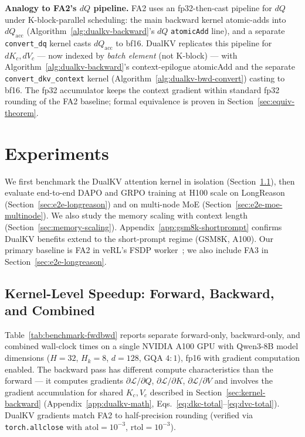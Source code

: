 \documentclass{article}
\begin{document}
\textbf{Analogy to FA2's $dQ$ pipeline.} FA2 uses an fp32-then-cast pipeline for $dQ$ under K-block-parallel scheduling: the main backward kernel atomic-adds into $dQ_{\text{acc}}$ (Algorithm~\ref{alg:dualkv-backward}'s $dQ$ \texttt{atomicAdd} line), and a separate \texttt{convert\_dq} kernel casts $dQ_{\text{acc}}$ to bf16. DualKV replicates this pipeline for $dK_c, dV_c$ --- now indexed by \emph{batch element} (not K-block) --- with Algorithm~\ref{alg:dualkv-backward}'s context-epilogue atomicAdd and the separate \texttt{convert\_dkv\_context} kernel (Algorithm~\ref{alg:dualkv-bwd-convert}) casting to bf16. The fp32 accumulator keeps the context gradient within standard fp32 rounding of the FA2 baseline; formal equivalence is proven in Section~\ref{sec:equiv-theorem}.

\section{Experiments}
\label{sec:experiments}

We first benchmark the DualKV attention kernel in isolation (Section~\ref{sec:kernel-speedup}), then evaluate end-to-end DAPO and GRPO training at H100 scale on LongReason (Section~\ref{sec:e2e-longreason}) and on multi-node MoE (Section~\ref{sec:e2e-moe-multinode}). We also study the memory scaling with context length (Section~\ref{sec:memory-scaling}). Appendix~\ref{app:gsm8k-shortprompt} confirms DualKV benefits extend to the short-prompt regime (GSM8K, A100). Our primary baseline is FA2 in veRL's FSDP worker~\citep{linkedin2025gptoss}; we also include FA3 in Section~\ref{sec:e2e-longreason}.

\subsection{Kernel-Level Speedup: Forward, Backward, and Combined}
\label{sec:kernel-speedup}


Table~\ref{tab:benchmark-fwdbwd} reports separate forward-only, backward-only, and combined wall-clock times on a single NVIDIA A100 GPU with Qwen3-8B model dimensions ($H{=}32$, $H_k{=}8$, $d{=}128$, GQA $4{:}1$), fp16 with gradient computation enabled. The backward pass has different compute characteristics than the forward --- it computes gradients $\partial \mathcal{L}/\partial Q$, $\partial \mathcal{L}/\partial K$, $\partial \mathcal{L}/\partial V$ and involves the gradient accumulation for shared $K_c, V_c$ described in Section~\ref{sec:kernel-backward} (Appendix~\ref{app:dualkv-math}, Eqs.~\ref{eq:dkc-total}--\ref{eq:dvc-total}). DualKV gradients match FA2 to half-precision rounding (verified via \texttt{torch.allclose} with $\text{atol}{=}10^{-3}$, $\text{rtol}{=}10^{-3}$).
\end{document}
